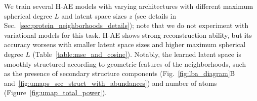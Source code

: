 We train several H-AE models with varying architectures with different maximum spherical degree $L$
and latent space sizes $z$ (see details in Sec.~\ref{sec:protein_neighborhoods_details}); note that
we do not experiment with variational models for this task. H-AE shows strong reconstruction
ability, but its accuracy worsens with smaller latent space sizes and higher maximum spherical
degree $L$ (Table~\ref{table:mse_and_cosine}).
Notably, the learned latent space is smoothly structured according to geometric
features of the neighborhoods, such as the presence of secondary structure components
(Fig.~\ref{fig:lba_diagram}B and~\ref{fig:umaps_sec_struct_with_abundances}) and number of atoms
(Figure~\ref{fig:umap_total_power}).




\begin{table}[t]
\begin{center}
\end{center}
\end{table}
